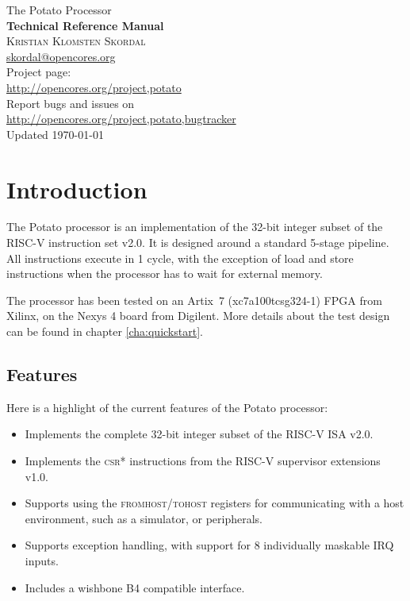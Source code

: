 \documentclass[12pt,a4paper]{report}
\newcommand{\register}[1]{\textsc{#1}}
\begin{document}
\begin{titlepage}
	\begin{center}
		\vspace*{3cm}
		{\large The Potato Processor}\\[0.5cm]
		{\Huge\bf Technical Reference Manual}\\[6cm]

		\textsc{Kristian Klomsten Skordal}\\\href{mailto:skordal@opencores.org}{skordal@opencores.org}\\[3em]

		\vfill
		{Project page:\\\url{http://opencores.org/project,potato}}\\[0.2em]
		{Report bugs and issues on\\\url{http://opencores.org/project,potato,bugtracker}}\\[1.2em]
		{\small Updated \today}
	\end{center}
\end{titlepage}

\tableofcontents

\chapter{Introduction}

The Potato processor is an implementation of the 32-bit integer subset of the RISC-V
instruction set v2.0. It is designed around a standard 5-stage pipeline. All instructions
execute in 1 cycle, with the exception of load and store instructions when the processor
has to wait for external memory.

The processor has been tested on an Artix~7 (xc7a100tcsg324-1) FPGA from Xilinx, on the
Nexys 4 board from Digilent. More details about the test design can be found in chapter
\ref{cha:quickstart}.

\section{Features}
Here is a highlight of the current features of the Potato processor:

\begin{itemize}
\item Implements the complete 32-bit integer subset of the RISC-V ISA v2.0.
\item Implements the \textsc{csr*} instructions from the RISC-V supervisor extensions v1.0.
\item Supports using the \register{fromhost}/\register{tohost} registers for communicating
	with a host environment, such as a simulator, or peripherals.
\item Supports exception handling, with support for 8 individually maskable IRQ inputs.
\item Includes a wishbone B4 compatible interface.
\end{itemize}
\end{document}
